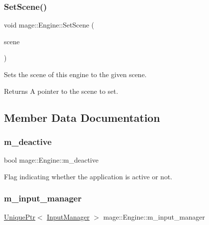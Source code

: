 \subsubsection{\texorpdfstring{Set\+Scene()}{SetScene()}}
{\footnotesize\ttfamily void mage\+::\+Engine\+::\+Set\+Scene (\begin{DoxyParamCaption}\item[{\hyperlink{namespacemage_a1e01ae66713838a7a67d30e44c67703e}{Shared\+Ptr}$<$ \hyperlink{classmage_1_1_scene}{Scene} $>$}]{scene }\end{DoxyParamCaption})}

Sets the scene of this engine to the given scene.

\begin{DoxyReturn}{Returns}
A pointer to the scene to set. 
\end{DoxyReturn}


\subsection{Member Data Documentation}
\hypertarget{classmage_1_1_engine_ab8a4b0157403708ae7d1d018a95b4c63}{}\label{classmage_1_1_engine_ab8a4b0157403708ae7d1d018a95b4c63} 
\subsubsection{\texorpdfstring{m\+\_\+deactive}{m\_deactive}}
{\footnotesize\ttfamily bool mage\+::\+Engine\+::m\+\_\+deactive\hspace{0.3cm}{\ttfamily [private]}}

Flag indicating whether the application is active or not. \hypertarget{classmage_1_1_engine_a8e9048208a6a5c5b034aaa1cbdab28bc}{}\label{classmage_1_1_engine_a8e9048208a6a5c5b034aaa1cbdab28bc} 
\subsubsection{\texorpdfstring{m\+\_\+input\+\_\+manager}{m\_input\_manager}}
{\footnotesize\ttfamily \hyperlink{namespacemage_a8c307fbcc33bce9b7f2aa4c26c3b95cf}{Unique\+Ptr}$<$ \hyperlink{classmage_1_1_input_manager}{Input\+Manager} $>$ mage\+::\+Engine\+::m\+\_\+input\+\_\+manager\hspace{0.3cm}{\ttfamily [private]}}

